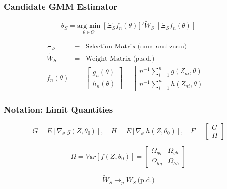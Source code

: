 \begin{frame}
\frametitle{Candidate GMM Estimator}

	\alert{\[\widehat{\theta}_S = \underset{\theta \in \Theta}{\mbox{arg min}}\; \left[\Xi_S f_n(\theta)\right]' \widetilde{W}_S \; \left[ \Xi_S f_n(\theta)\right]\]}

\begin{eqnarray*}
	\Xi_S &=& \mbox{Selection Matrix (ones and zeros)}\\
	\widetilde{W}_S &=& \mbox{Weight Matrix (p.s.d.)}\\
	f_n(\theta) &=& \left[\begin{array}{c} g_n(\theta)\\ h_n(\theta) \end{array} \right]=\left[\begin{array}{c}n^{-1}\sum_{i=1}^n g(Z_{ni},\theta) \\ n^{-1}\sum_{i=1}^n h(Z_{ni},\theta) \end{array}\right]
\end{eqnarray*}		

\end{frame}
\begin{frame}
\frametitle{Notation: Limit Quantities}

	\[G = E\left[\nabla_{\theta} \; g(Z,\theta_0)\right], \quad H = E\left[\nabla_{\theta} \; h(Z,\theta_0)\right], \quad F = \left[ \begin{array}{c} G \\ H \end{array} \right]  \]

	\[\Omega = Var\left[ f(Z,\theta_0) \right] = \left[\begin{array} {cc} \Omega_{gg} & \Omega_{gh}\\ \Omega_{hg}&\Omega_{hh}\end{array} \right]  \]

	\[
	\widetilde{W}_S \rightarrow_p W_S \; \mbox{(p.d.)}
	\]
\end{frame}


